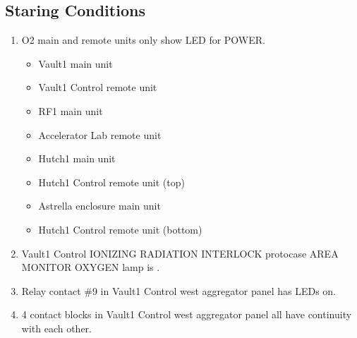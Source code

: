 \documentclass[letterpaper,10pt,english]{sphinxmanual}
\begin{document}
\subsection{Staring Conditions}
\label{\detokenize{testing_documentation/O2_testing:staring-conditions}}\begin{enumerate}
%
\item {} 
\sphinxAtStartPar
O2 main and remote units only show LED for POWER.
\begin{itemize}
\item {} 
\sphinxAtStartPar
Vault\sphinxhyphen{}1 main unit

\item {} 
\sphinxAtStartPar
Vault\sphinxhyphen{}1 Control remote unit

\item {} 
\sphinxAtStartPar
RF\sphinxhyphen{}1 main unit

\item {} 
\sphinxAtStartPar
Accelerator Lab remote unit

\item {} 
\sphinxAtStartPar
Hutch\sphinxhyphen{}1 main unit

\item {} 
\sphinxAtStartPar
Hutch\sphinxhyphen{}1 Control remote unit (top)

\item {} 
\sphinxAtStartPar
Astrella enclosure main unit

\item {} 
\sphinxAtStartPar
Hutch\sphinxhyphen{}1 Control remote unit (bottom)

\end{itemize}

\item {} 
\sphinxAtStartPar
Vault\sphinxhyphen{}1 Control IONIZING RADIATION INTERLOCK protocase AREA MONITOR OXYGEN lamp is .

\item {} 
\sphinxAtStartPar
Relay contact \#9 in Vault\sphinxhyphen{}1 Control west aggregator panel has LEDs on.

\item {} 
\sphinxAtStartPar
{} 4 contact blocks in Vault\sphinxhyphen{}1 Control west aggregator panel all have continuity with each other.

\end{enumerate}
\end{document}
